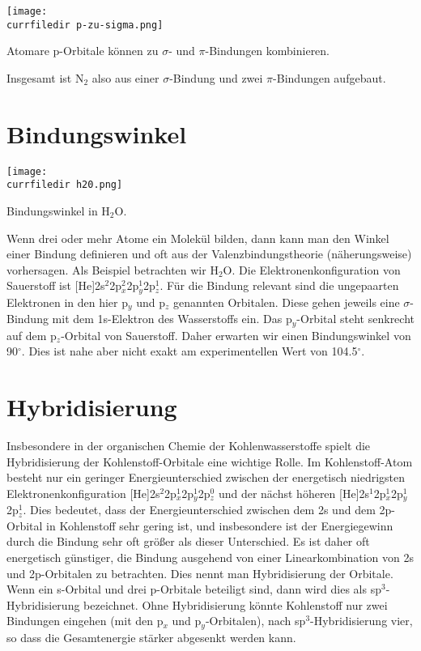 %
\begin{marginfigure}
\texttt{[image: \\currfiledir p-zu-sigma.png]}
\caption{Atomare p-Orbitale können zu $\sigma$- und $\pi$-Bindungen kombinieren. }
\end{marginfigure}
%

Insgesamt ist N$_2$ also aus einer $\sigma$-Bindung und zwei $\pi$-Bindungen
aufgebaut.


\section{Bindungswinkel}

%
\begin{marginfigure}
\texttt{[image: \\currfiledir h20.png]}
\caption{Bindungswinkel in  H$_2$O. }
\end{marginfigure}
%
Wenn drei oder mehr Atome ein Molekül bilden, dann kann man den Winkel einer Bindung definieren und oft aus der Valenzbindungstheorie (näherungsweise) vorhersagen. Als Beispiel betrachten wir H$_2$O. Die Elektronenkonfiguration von Sauerstoff ist [He]2s$^2$2p$_x^2$2p$_y^1$2p$_z^1$. Für die Bindung relevant sind die ungepaarten Elektronen in den hier p$_y$ und p$_z$ genannten Orbitalen. Diese gehen jeweils eine $\sigma$-Bindung mit dem 1s-Elektron des Wasserstoffs ein. Das p$_y$-Orbital steht senkrecht auf dem  p$_z$-Orbital von Sauerstoff. Daher erwarten wir einen Bindungswinkel von 90$^\circ$. Dies ist nahe aber nicht exakt am experimentellen Wert von 104.5$^\circ$.



\section{Hybridisierung}

Insbesondere in der organischen Chemie der Kohlenwasserstoffe spielt die Hybridisierung der Kohlenstoff-Orbitale eine wichtige Rolle. Im Kohlenstoff-Atom besteht nur ein geringer Energieunterschied zwischen der energetisch niedrigsten Elektronenkonfiguration
[He]2s$^2$2p$_x^1$2p$_y^1$2p$_z^0$ und der nächst höheren [He]2s$^1$2p$_x^1$2p$_y^1$2p$_z^1$. Dies bedeutet, dass der Energieunterschied zwischen dem 2s und dem 2p-Orbital in Kohlenstoff sehr gering ist, und insbesondere 
ist der Energiegewinn durch die Bindung sehr oft größer als dieser Unterschied. Es ist daher oft energetisch günstiger, die Bindung ausgehend von einer Linearkombination von 2s und 2p-Orbitalen zu betrachten. Dies nennt man Hybridisierung der Orbitale. Wenn ein s-Orbital und drei p-Orbitale beteiligt sind, dann wird dies als sp$^3$-Hybridisierung bezeichnet. Ohne Hybridisierung könnte Kohlenstoff nur zwei Bindungen eingehen (mit den p$_x$ und p$_y$-Orbitalen), nach sp$^3$-Hybridisierung vier, so dass die Gesamtenergie stärker abgesenkt werden kann.

